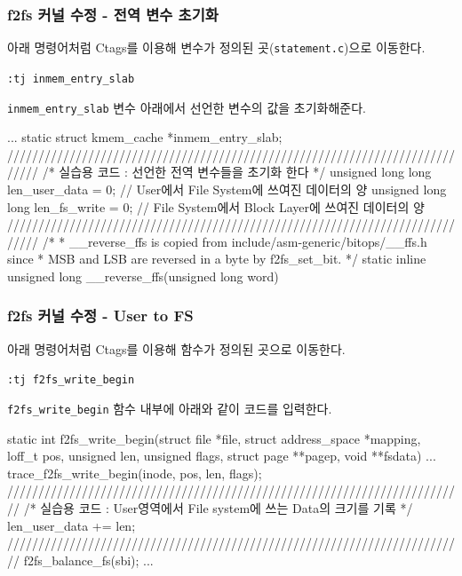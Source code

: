 \documentclass[newPxFont,sthlmFooter,nooffset]{beamer}
\begin{document}
\begin{frame}[containsverbatim,t]
  \frametitle{f2fs 커널 수정 - 전역 변수 초기화}
아래 명령어처럼 Ctags를 이용해 변수가 정의된 곳(\texttt{statement.c})으로 이동한다.
\begin{mdframed}[backgroundcolor=lightgray,hidealllines=true]
\texttt{\textcolor[rgb]{0,0,0}{:tj inmem\_entry\_slab}}
\end{mdframed}
\bigskip
\texttt{inmem\_entry\_slab} 변수 아래에서 선언한 변수의 값을 초기화해준다.
\begin{codedef}
...
static struct kmem_cache *inmem_entry_slab;
/////////////////////////////////////////////////////////////////////////////
/* 실습용 코드 : 선언한 전역 변수들을 초기화 한다 */
unsigned long long len_user_data = 0;  
		// User에서 File System에 쓰여진 데이터의 양
unsigned long long len_fs_write = 0;    
		// File System에서 Block Layer에 쓰여진 데이터의 양
/////////////////////////////////////////////////////////////////////////////
/*
 * __reverse_ffs is copied from include/asm-generic/bitops/__ffs.h since
 * MSB and LSB are reversed in a byte by f2fs_set_bit.
 */
static inline unsigned long __reverse_ffs(unsigned long word)
\end{codedef}
\end{frame}

\begin{frame}[containsverbatim,t]
  \frametitle{f2fs 커널 수정 - User to FS}
아래 명령어처럼 Ctags를 이용해 함수가 정의된 곳으로 이동한다.
\begin{mdframed}[backgroundcolor=lightgray,hidealllines=true]
\texttt{\textcolor[rgb]{0,0,0}{:tj f2fs\_write\_begin}}
\end{mdframed}
\bigskip
\texttt{f2fs\_write\_begin} 함수 내부에 아래와 같이 코드를 입력한다.
\begin{codedef}
static int f2fs_write_begin(struct file *file, struct address_space *mapping,
                loff_t pos, unsigned len, unsigned flags,
                struct page **pagep, void **fsdata)
{
        ...
        trace_f2fs_write_begin(inode, pos, len, flags);
//////////////////////////////////////////////////////////////////////////       
/* 실습용 코드 : User영역에서 File system에 쓰는 Data의 크기를 기록 */
        len_user_data += len;
//////////////////////////////////////////////////////////////////////////
        f2fs_balance_fs(sbi);
        ...
}
\end{codedef}
\end{frame}
\end{document}
